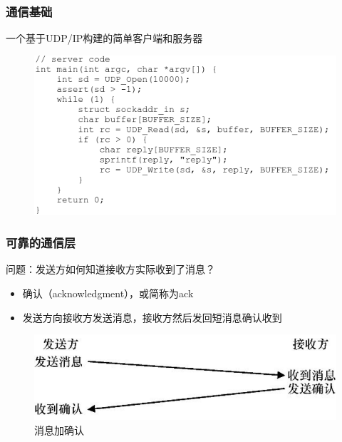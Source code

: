 \begin{frame}[fragile]
    \frametitle{通信基础}
    一个基于UDP/IP构建的简单客户端和服务器
    \begin{figure}
        \includegraphics[width=0.8\linewidth]{figs/udp-server.png}
    \end{figure}
\end{frame}
\begin{frame}[fragile]
    \frametitle{可靠的通信层}
    问题：发送方如何知道接收方实际收到了消息？ \pause
    \begin{itemize}
        \item 确认（acknowledgment），或简称为ack
        \item     发送方向接收方发送消息，接收方然后发回短消息确认收到
    \end{itemize}
    
    \begin{figure}
        \includegraphics[width=0.8\linewidth]{figs/ack.png}
        \caption{消息加确认}
    \end{figure}
\end{frame}
